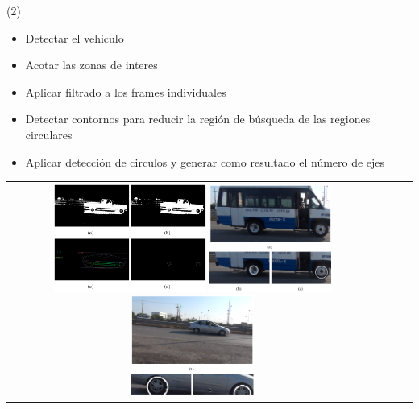 \begin{frame}{ (2)}
	\begin{itemize}
        \item Detectar el vehiculo
        \item Acotar las zonas de interes
        \item Aplicar filtrado a los frames individuales
        \item Detectar contornos para reducir la región de búsqueda de las regiones circulares
        \item Aplicar detección de circulos y generar como resultado el número de ejes
	\end{itemize}
\begin{center}
 \begin{tabular}{cccc}
    \includegraphics[width=5cm]{2014_Llantas/figs/LuisRodolfo5}
    \includegraphics[width=4cm]{2014_Llantas/figs/LuisRodolfo3}
    \includegraphics[width=4cm]{2014_Llantas/figs/LuisRodolfo4}
  \end{tabular}
\end{center}

\end{frame}






